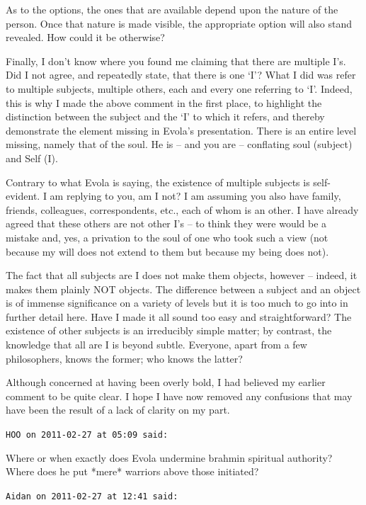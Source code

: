 \begin{footnotesize}
\begin{sffamily}
As to the options, the ones that are available depend upon the nature of the person. Once that nature is made visible, the appropriate option will also stand revealed. How could it be otherwise?

Finally, I don't know where you found me claiming that there are multiple I's. Did I not agree, and repeatedly state, that there is one `I'? What I did was refer to multiple subjects, multiple others, each and every one referring to `I'. Indeed, this is why I made the above comment in the first place, to highlight the distinction between the subject and the `I' to which it refers, and thereby demonstrate the element missing in Evola's presentation. There is an entire level missing, namely that of the soul. He is -- and you are -- conflating soul (subject) and Self (I).

Contrary to what Evola is saying, the existence of multiple subjects is self-evident. I am replying to you, am I not? I am assuming you also have family, friends, colleagues, correspondents, etc., each of whom is an other. I have already agreed that these others are not other I's -- to think they were would be a mistake and, yes, a privation to the soul of one who took such a view (not because my will does not extend to them but because my being does not).

The fact that all subjects are I does not make them objects, however -- indeed, it makes them plainly NOT objects. The difference between a subject and an object is of immense significance on a variety of levels but it is too much to go into in further detail here. Have I made it all sound too easy and straightforward? The existence of other subjects is an irreducibly simple matter; by contrast, the knowledge that all are I is beyond subtle. Everyone, apart from a few philosophers, knows the former; who knows the latter?

Although concerned at having been overly bold, I had believed my earlier comment to be quite clear. I hope I have now removed any confusions that may have been the result of a lack of clarity on my part.

\hfill

\texttt{HOO on 2011-02-27 at 05:09 said:}

Where or when exactly does Evola undermine brahmin spiritual authority? Where does he put *mere* warriors above those initiated?

\hfill

\texttt{Aidan on 2011-02-27 at 12:41 said:}


\end{sffamily}
\end{footnotesize}
